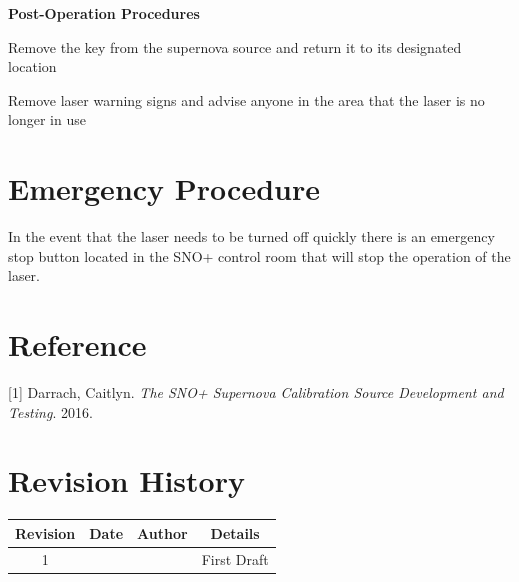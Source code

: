 \textbf{Post-Operation Procedures}
\begin{enumerate}
\begin{checklist}
    \item Remove the key from the supernova source and return it to its designated location
    \item Remove laser warning signs and advise anyone in the area that the laser is no longer in use
\end{checklist}
\end{enumerate}
\section{Emergency Procedure}
In the event that the laser needs to be turned off quickly there is an emergency stop button located in the SNO+ control room that will stop the operation of the laser. 

\section*{Reference}
[1] Darrach, Caitlyn. {\itshape The SNO+ Supernova Calibration Source Development and Testing}. 2016.
\newline

\appendix

\section{Revision History}
\begin{center}
\begin{tabular}{|c|c|c|c|}
\hline
     \textbf{Revision} & \textbf{Date} & \textbf{Author} & \textbf{Details}  \\
     \hline
     1& & & First Draft \\
     \hline
\end{tabular}
\end{center}



 
